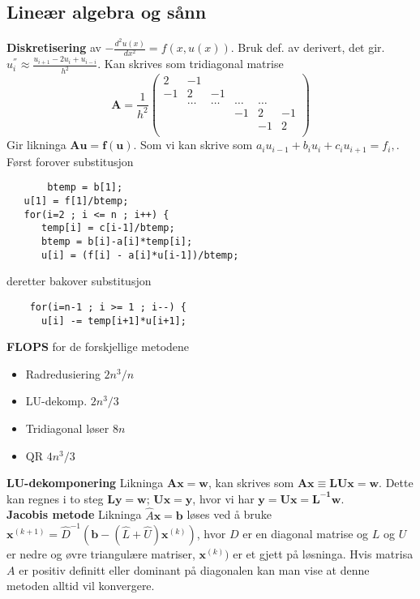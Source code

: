 \documentclass[12pt,a4paper,twocolumn]{article}
\begin{document}
\begin{flushleft}
\subsection{Lineær algebra og sånn} %
\label{sub:linalg}
\textbf{Diskretisering} av $-\frac{d^2u(x)}{dx^2} = f(x,u(x))$. Bruk def. av derivert, det gir. $u^{''}_i \approx  \frac{u_{i+1} -2u_i +u_{i-i}}{h^2}.$ Kan skrives som tridiagonal matrise
\begin{equation*}
\mathbf{A} = \frac{1}{h^2}\left(\begin{array}{cccccc}
                          2 & -1 &  &   &  & \\
                          -1 & 2 & -1 & & & \\
                           & \dots   & \dots &\dots   &\dots & \\
                           &   &  &-1  &2& -1 \\
                           &    &  &   &-1 & 2 \\
                      \end{array} \right)	
\end{equation*}
Gir likninga $\mathbf{A}\mathbf{u} = \mathbf{f}(\mathbf{u}).$ Som vi kan skrive som $a_iu_{i-1}+b_iu_i+c_iu_{i+1} = f_i,$. Først forover substitusjon
\begin{verbatim}
	   btemp = b[1];
   u[1] = f[1]/btemp;
   for(i=2 ; i <= n ; i++) {
      temp[i] = c[i-1]/btemp;
      btemp = b[i]-a[i]*temp[i];
      u[i] = (f[i] - a[i]*u[i-1])/btemp;
\end{verbatim}
deretter bakover substitusjon
\begin{verbatim}
	for(i=n-1 ; i >= 1 ; i--) {
      u[i] -= temp[i+1]*u[i+1];
\end{verbatim}
\textbf{FLOPS} for de forskjellige metodene
\begin{itemize}
	\item Radredusiering $2n^3/n$
	\item LU-dekomp. $2n^3/3$
	\item Tridiagonal løser $8n$ 
	\item QR $4n^3/3$
\end{itemize}
\textbf{LU-dekomponering} Likninga $\mathbf{Ax}=\mathbf{w}$, kan skrives som $\mathbf{A} \mathbf{x} \equiv \mathbf{L} \mathbf{U} \mathbf{x} =\mathbf{w}$. Dette kan regnes i to steg $\mathbf{L} \mathbf{y} = \mathbf{w};\, \mathbf{Ux}=\mathbf{y}$, hvor vi har $\mathbf{y}=\mathbf{Ux}=\mathbf{L^{-1}w}$.\\
\textbf{Jacobis metode} Likninga $\hat{A}\mathbf{x}=\mathbf{b}$ løses ved å bruke $\mathbf{x}^{(k+1)}= \hat{D}^{-1}(\mathbf{b}-(\hat{L}+\hat{U})\mathbf{x}^{(k)})$, hvor $D$ er en diagonal matrise og $L$ og $U$ er nedre og øvre triangulære matriser, $\mathbf{x}^{(k)})$ er et gjett på løsninga. Hvis matrisa $A$ er positiv definitt eller dominant på diagonalen kan man vise at denne metoden alltid vil konvergere. 

\end{flushleft}
\end{document}
